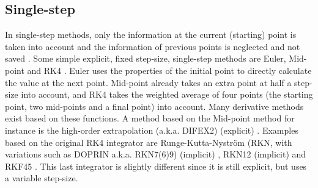 \subsection{Single-step}
\label{subsec:single}
In single-step methods, only the information at the current (starting) point is taken into account and the information of previous points is neglected and not saved \cite{noomen2013int}.  
Some simple explicit, fixed step-size, single-step methods are Euler, Mid-point and \ac{RK4} \cite{hofsteenge2013}. Euler uses the properties of the initial point to directly calculate the value at the next point. Mid-point already takes an extra point at half a step-size into account, and \ac{RK4} takes the weighted average of four points (the starting point, two mid-points and a final point) into account. Many derivative methods exist based on these functions. A method based on the Mid-point method for instance is the high-order extrapolation (a.k.a. DIFEX2) (explicit) \cite{deuflhard1994}. Examples based on the original \ac{RK4} integrator are Runge-Kutta-Nystr\"{o}m (RKN, with variations such as DOPRIN a.k.a. RKN7(6)9) (implicit) \cite{montenbruck1992,dormand1987}, \ac{RKN12} (implicit) \cite{montenbruck1992}  and \acf{RKF45} \cite{fehlberg1969,fehlberg1968}. This last integrator is slightly different since it is still explicit, but uses a variable step-size. 





